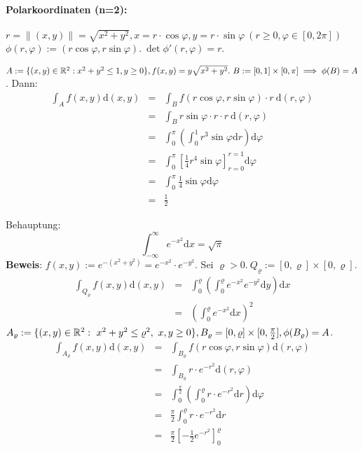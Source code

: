 \documentclass[a4paper,twoside,DIV15,BCOR12mm]{scrbook}
\begin{document}
\paragraph{Polarkoordinaten (n=2):} $ $\\
$r=\|(x,y)\|=\sqrt{x^2+y^2}, x=r\cdot\cos\varphi, y=r\cdot\sin\varphi\ (r\ge 0, \varphi\in[0,2\pi])$\\
$\phi(r,\varphi):=(r\cos\varphi, r\sin\varphi).\ \det \phi'(r,\varphi)=r$.
\begin{beispiele}
\item $A:=\{(x,y)\in\mathbb{R}^2:x^2+y^2\le1, y\ge 0\}, f(x,y)=y\sqrt{x^2+y^2}.\ B:=[0,1]\times[0,\pi]\implies\phi(B)=A$.
Dann:
\begin{eqnarray*}
\int_Af(x,y)\text{d}(x,y)&=&\int_Bf(r\cos\varphi,r\sin\varphi)\cdot r\ \text{d}(r,\varphi)\\
&=&\int_Br\sin\varphi\cdot r\cdot r\ \text{d}(r,\varphi)\\
&=&\int_0^\pi(\int_0^1 r^3\sin\varphi\text{d}r)\text{d}\varphi\\
&=&\int_0^\pi\left[\frac{1}{4}r^4\sin\varphi\right]_{r=0}^{r=1}\text{d}\varphi\\
&=&\int_0^\pi\frac{1}{4}\sin\varphi\text{d}\varphi\\
&=&\frac{1}{2}
\end{eqnarray*}
\item Behauptung:
\[
	\int_{-\infty}^\infty e^{-x^2}\text{d}x=\sqrt{\pi}
\]
\textbf{Beweis}: $f(x,y):=e^{-(x^2+y^2)}=e^{-x^2}\cdot e^{-y^2}$. Sei $\varrho>0.\ Q_\varrho:=[0,\varrho]\times[0,\varrho]$.
\begin{eqnarray*}
\int_{Q_\varrho}f(x,y)\text{d}(x,y)&=&\int_0^\varrho(\int_0^\varrho e^{-x^2}e^{-y^2}\text{d}y)\text{d}x\\
&=&(\int_0^\varrho e^{-x^2}\text{d}x)^2
\end{eqnarray*}
$A_{\varrho}:=\{(x,y)\in\MdR^2:\ x^2+y^2\le\varrho^2,\ x,y\ge 0\}, B_{\varrho}=[0,\varrho]\times[0,\frac{\pi}{2}], \phi(B_{\varrho})=A$.
\begin{eqnarray*}
\int_{A_\varrho}f(x,y)\text{d}(x,y)&=&\int_{B_\varrho}f(r\cos\varphi,r\sin\varphi)\text{d}(r,\varphi)\\
&=&\int_{B_\varrho}r\cdot e^{-r^2}\text{d}(r,\varphi)\\
&=&\int_0^{\frac{\pi}{2}}(\int_0^\varrho r\cdot e^{-r^2}\text{d}r)\text{d}\varphi\\
&=&\frac{\pi}{2}\int_0^{\varrho}r\cdot e^{-r^2}\text{d}r\\
&=&\frac{\pi}{2}\left[-\frac{1}{2}e^{-r^2}\right]_0^{\varrho}\\

\end{eqnarray*}
\end{beispiele}
\end{document}
